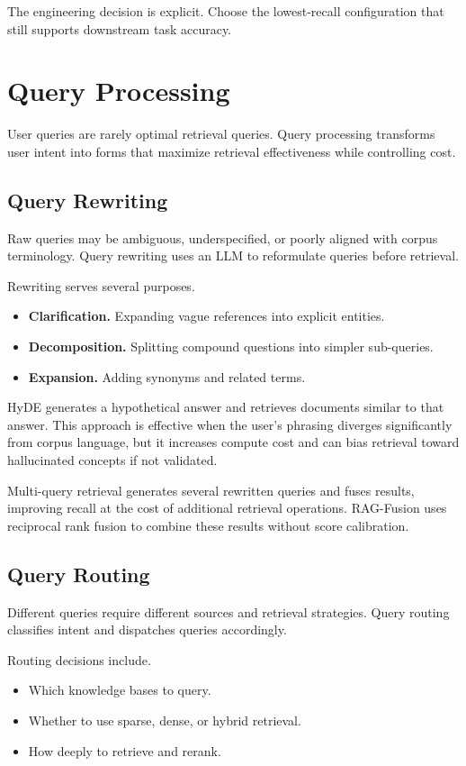 The engineering decision is explicit. Choose the lowest-recall configuration that still supports downstream task accuracy.

\section{Query Processing}

User queries are rarely optimal retrieval queries. Query processing transforms user intent into forms that maximize retrieval effectiveness while controlling cost.

\subsection{Query Rewriting}

Raw queries may be ambiguous, underspecified, or poorly aligned with corpus terminology. Query rewriting uses an LLM to reformulate queries before retrieval.

Rewriting serves several purposes.
\begin{itemize}
\item \textbf{Clarification.} Expanding vague references into explicit entities.
\item \textbf{Decomposition.} Splitting compound questions into simpler sub-queries.
\item \textbf{Expansion.} Adding synonyms and related terms.
\end{itemize}

HyDE \cite{hyde} generates a hypothetical answer and retrieves documents similar to that answer. This approach is effective when the user’s phrasing diverges significantly from corpus language, but it increases compute cost and can bias retrieval toward hallucinated concepts if not validated.

Multi-query retrieval generates several rewritten queries and fuses results, improving recall at the cost of additional retrieval operations. RAG-Fusion \cite{ragfusion} uses reciprocal rank fusion to combine these results without score calibration.

\subsection{Query Routing}

Different queries require different sources and retrieval strategies. Query routing classifies intent and dispatches queries accordingly.

Routing decisions include.
\begin{itemize}
\item Which knowledge bases to query.
\item Whether to use sparse, dense, or hybrid retrieval.
\item How deeply to retrieve and rerank.
\end{itemize}

